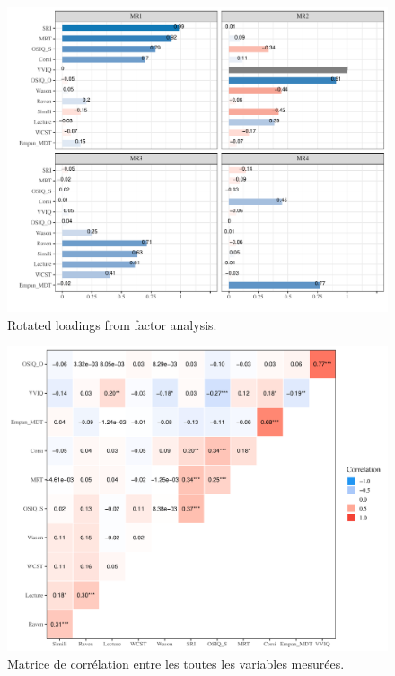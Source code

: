\documentclass[
  12pt,
]{article}
\begin{document}
\begin{figure}[H]

\includegraphics[width=\textwidth,height=0.5\textheight]{aphantasia_quarto_files/figure-pdf/loadings_graph_annex-1.pdf}

\caption{Rotated loadings from factor analysis.}
\label{loadings_graph_annex}
\end{figure}

\begin{figure}[H]

\includegraphics[width=\textwidth,height=0.5\textheight]{aphantasia_quarto_files/figure-pdf/correlation_matrix-1.pdf}

\caption{Matrice de corrélation entre les toutes les variables mesurées.}
\label{correlation_matrix}
\end{figure}
\end{document}
